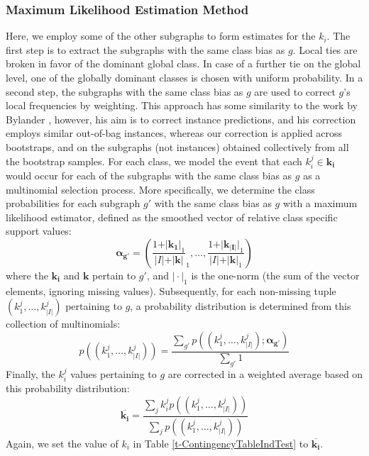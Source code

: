 \documentclass{sig-alternate}
\begin{document}
\subsubsection{Maximum Likelihood Estimation Method}
\label{ss:MLE}
Here, we employ some of the other subgraphs to form estimates for the $k_i$.
The first step is to extract the subgraphs with the same class
bias as $g$. Local ties are broken in
favor of the dominant global class. In case of a further tie on the global
level, one of the globally dominant classes is chosen with uniform probability.
In a second step, the subgraphs with the same class bias as $g$ are used to correct
$g$'s local frequencies by weighting. This approach has some similarity to the
work by Bylander \cite{bylander02estimating}, however, his aim is to correct
instance predictions, and his correction employs similar out-of-bag instances,
whereas our correction is applied across bootstraps, and on the subgraphs (not
instances) obtained collectively from all the bootstrap samples. For each
class, we model the event that each $k_i^j \in \mathbf{k_i}$ would occur for
each of the subgraphs with the same class bias as $g$ as a multinomial
selection process. More specifically, we determine the class probabilities for
each subgraph $g'$ with the same class bias as $g$ with a maximum likelihood
estimator, defined as the smoothed vector of relative class specific support values:
\begin{equation}
  \mathbf{\alpha_{g'}} = \left(\frac{1+\vert\mathbf{k_1}\vert_1}{\vert I\vert+\vert\mathbf{k}\vert}_1,\ldots,\frac{1+\vert\mathbf{k_{\vert I\vert}}\vert_1}{\vert I\vert+\vert\mathbf{k}\vert_1}\right)
  \label{eqn:mlexpr}
\end{equation}
where the $\mathbf{k_i}$ and $\mathbf{k}$ pertain to $g'$, and $\vert\cdot\vert_1$ is the one-norm (the sum of the vector elements, ignoring missing values). Subsequently, for
each non-missing tuple $(k_1^j,\ldots,k_{\vert I\vert}^j)$ pertaining to $g$, a probability distribution is
determined from this collection of multinomials:
\begin{equation}
  p((k_1^j,\ldots,k_{\vert I\vert}^j))=\frac{\sum_{g'} p((k_1^j,\ldots,k_{\vert I\vert}^j); \mathbf{\alpha_{g'}})}{\sum_{g'}1}
  \label{eqn:avgpr}
\end{equation}
Finally, the $k_i^j$ values pertaining to $g$ are corrected in a weighted average
based on this probability distribution:
\begin{equation}
  \overline{\mathbf{k_i}}=\frac{\sum_j k_i^j p((k_1^j,\ldots,k_{\vert I\vert}^j))}{\sum_j p((k_1^j,\ldots,k_{\vert I\vert}^j))}
  \label{eqn:avgki}
\end{equation}
Again, we set the value of $k_i$ in Table \ref{t-ContingencyTableIndTest} to $\overline{\mathbf{k_i}}$.
\end{document}
